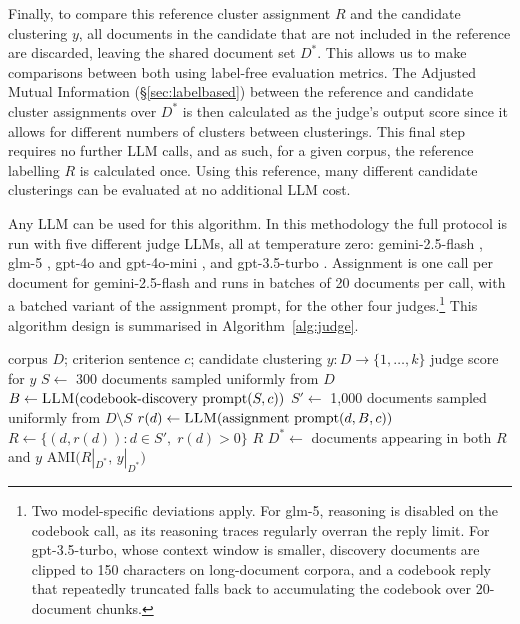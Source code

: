 \documentclass[11pt,a4paper,oneside]{report}
\begin{document}
Finally, to compare this reference cluster assignment $R$ and the candidate clustering $y$, all documents in the candidate that are not included in the reference are discarded, leaving the shared document set $D^{\ast}$. This allows us to make comparisons between both using label-free evaluation metrics. The Adjusted Mutual Information (\S\ref{sec:labelbased}) between the reference and candidate cluster assignments over $D^{\ast}$ is then calculated as the judge's output score since it allows for different numbers of clusters between clusterings. This final step requires no further LLM calls, and as such, for a given corpus, the reference labelling $R$ is calculated once. Using this reference, many different candidate clusterings can be evaluated at no additional LLM cost.

Any LLM can be used for this algorithm. In this methodology the full protocol is run with five different judge LLMs, all at temperature zero: {\small\ttfamily gemini-2.5-flash} \citep{geminiteam2025gemini25}, {\small\ttfamily glm-5} \citep{zhipu2026glm5}, {\small\ttfamily gpt-4o} and {\small\ttfamily gpt-4o-mini} \citep{openai2024gpt4o}, and {\small\ttfamily gpt-3.5-turbo} \citep{openai2023gpt35}. Assignment is one call per document for {\small\ttfamily gemini-2.5-flash} and runs in batches of 20 documents per call, with a batched variant of the assignment prompt, for the other four judges.\footnote{Two model-specific deviations apply. For {\small\ttfamily glm-5}, reasoning is disabled on the codebook call, as its reasoning traces regularly overran the reply limit. For {\small\ttfamily gpt-3.5-turbo}, whose context window is smaller, discovery documents are clipped to 150 characters on long-document corpora, and a codebook reply that repeatedly truncated falls back to accumulating the codebook over 20-document chunks.} This algorithm design is summarised in Algorithm~\ref{alg:judge}.

\begin{algorithm}[htbp]
\caption{The codebook judge}
\label{alg:judge}
\begin{algorithmic}[1]
\Require corpus $D$; criterion sentence $c$; candidate clustering $y : D \to \{1,\dots,k\}$
\Ensure  judge score for $y$
\Statex
{}
\State $S \gets$ 300 documents sampled uniformly from $D$
\State $B \gets \Call{LLM}{\text{codebook-discovery prompt}(S, c)}$ 
\State $S' \gets$ 1{,}000 documents sampled uniformly from $D \setminus S$
\State $r(d) \gets \Call{LLM}{\text{assignment prompt}(d, B, c)}$ 
\EndFor
\State $R \gets \{(d, r(d)) : d \in S',\; r(d) > 0\}$ 
\State \Return $R$
\EndProcedure
\Statex
{}
\State $D^\ast \gets$ documents appearing in both $R$ and $y$
\State \Return $\mathrm{AMI}\big(R|_{D^\ast},\, y|_{D^\ast}\big)$
\EndProcedure
\end{algorithmic}
\end{algorithm}
\end{document}
